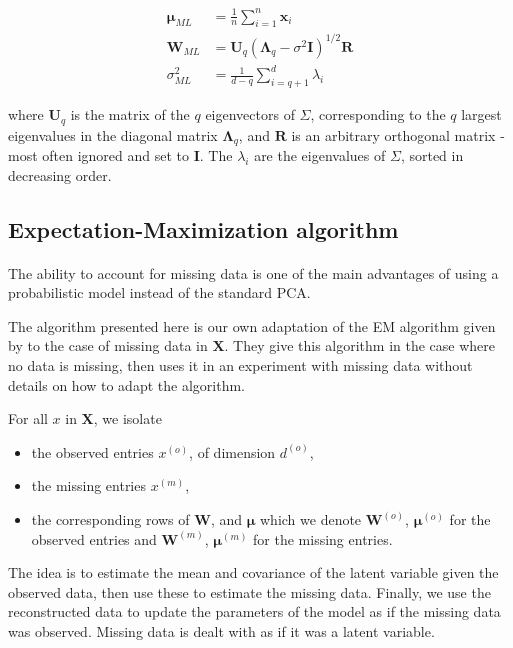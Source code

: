 \documentclass{article}
\begin{document}
\begin{align}
    \label{eq:ppca_mu_ml}
    \boldsymbol{\mu}_{ML} &= \frac{1}{n} \sum_{i=1}^n \mathbf{x}_i \\
    \label{eq:ppca_W_ml}
    \mathbf{W}_{ML} &= \mathbf{U}_q \left(\mathbf{\Lambda}_q - \sigma^2\mathbf{I}\right)^{1/2} \mathbf{R} \\
    \label{eq:ppca_sigma_ml}
    \sigma^2_{ML} &= \frac{1}{d-q} \sum_{i=q+1}^d \lambda_i
\end{align}

where $\mathbf{U}_q$ is the matrix of the $q$ eigenvectors of $\Sigma$, corresponding to the $q$ largest eigenvalues in the diagonal matrix $\mathbf{\Lambda}_q$, and $\mathbf{R}$ is an arbitrary orthogonal matrix - most often ignored and set to $\mathbf{I}$. The $\lambda_i$ are the eigenvalues of $\Sigma$, sorted in decreasing order.

\subsection{Expectation-Maximization algorithm}

\paragraph{} The ability to account for missing data is one of the main advantages of using a probabilistic model instead of the standard PCA.

The algorithm presented here is our own adaptation of the EM algorithm given by \citet{PPCA} to the case of missing data in $\mathbf{X}$. They give this algorithm in the case where no data is missing, then uses it in an experiment with missing data without details on how to adapt the algorithm.

For all $x$ in $\mathbf{X}$, we isolate
\begin{itemize}
    \item the observed entries $x^{(o)}$, of dimension $d^{(o)}$,
    \item the missing entries $x^{(m)}$,
    \item the corresponding rows of $\mathbf{W}$, and $\boldsymbol{\mu}$ which we denote $\mathbf{W}^{(o)}$, $\boldsymbol{\mu}^{(o)}$ for the observed entries and $\mathbf{W}^{(m)}$, $\boldsymbol{\mu}^{(m)}$ for the missing entries.
\end{itemize}

The idea is to estimate the mean and covariance of the latent variable given the observed data, then use these to estimate the missing data. Finally, we use the reconstructed data to update the parameters of the model as if the missing data was observed. Missing data is dealt with as if it was a latent variable.
\end{document}
